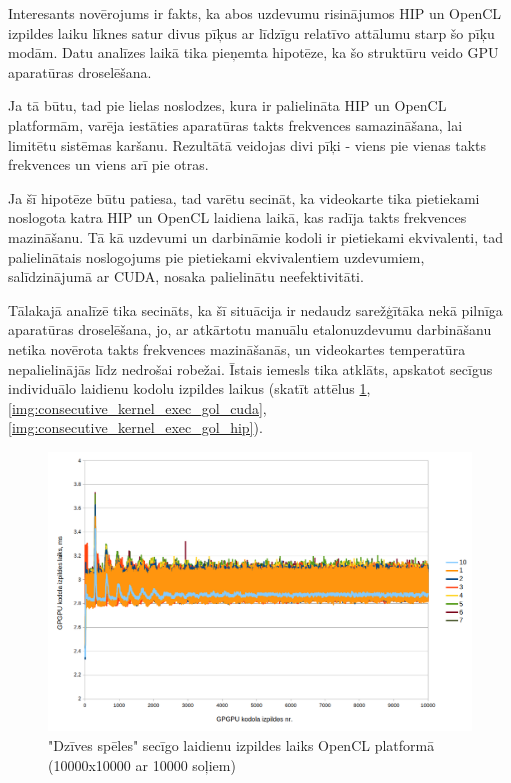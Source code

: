 Interesants novērojums ir fakts, ka abos uzdevumu risinājumos HIP un OpenCL
izpildes laiku līknes satur divus pīķus ar līdzīgu relatīvo attālumu starp šo
pīķu modām. Datu analīzes laikā tika pieņemta hipotēze, ka šo struktūru veido
GPU aparatūras droselēšana.

Ja tā būtu, tad pie lielas noslodzes, kura ir palielināta HIP un OpenCL
platformām, varēja iestāties aparatūras takts frekvences samazināšana, lai
limitētu sistēmas karšanu. Rezultātā veidojas divi pīķi - viens pie vienas
takts frekvences un viens arī pie otras.

Ja šī hipotēze būtu patiesa, tad varētu secināt, ka videokarte tika pietiekami
noslogota katra HIP un OpenCL laidiena laikā, kas radīja takts frekvences
mazināšanu. Tā kā uzdevumi un darbināmie kodoli ir pietiekami ekvivalenti, tad
palielinātais noslogojums pie pietiekami ekvivalentiem uzdevumiem,
salīdzinājumā ar CUDA, nosaka palielinātu neefektivitāti.

Tālakajā analīzē tika secināts, ka šī situācija ir nedaudz sarežģītāka nekā
pilnīga aparatūras droselēšana, jo, ar atkārtotu manuālu etalonuzdevumu
darbināšanu netika novērota takts frekvences mazināšanās, un videokartes
temperatūra nepalielinājās līdz nedrošai robežai. Īstais iemesls tika atklāts,
apskatot secīgus individuālo laidienu kodolu izpildes laikus (skatīt attēlus
\ref{img:consecutive_kernel_exec_gol_cl},
\ref{img:consecutive_kernel_exec_gol_cuda},
\ref{img:consecutive_kernel_exec_gol_hip}).

\begin{figure}[H] \centering
    \includegraphics[width=\textwidth]{images/gol_opencl_consecutive_runs_10k_by_10k_10ksteps.png}
    \caption{"Dzīves spēles" secīgo laidienu izpildes laiks OpenCL
    platformā (10000x10000 ar 10000 soļiem)}
    \label{img:consecutive_kernel_exec_gol_cl}
\end{figure}


